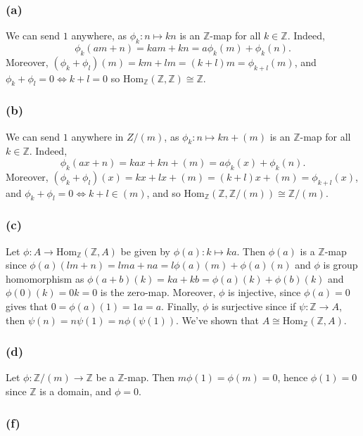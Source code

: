 \documentclass{article}
\theoremstyle{definition}
\newcommand{\Z}{\mathbb{Z}}
\newcommand{\Hom}{\text{Hom}}
\begin{document}
\subsubsection*{(a)}

We can send $1$ anywhere, as $\phi_k : n \mapsto k n$
is an $\Z$-map for all $k \in \Z$. Indeed, 
\[
	\phi_k(am + n)
	=
	kam + kn
	=
	a\phi_k(m) + \phi_k(n).
\] 
Moreover, $(\phi_k + \phi_{l})(m) = km + lm = (k + l)m = \phi_{k + l}(m)$, and
$\phi_k + \phi_l = 0 \Leftrightarrow k + l = 0$ so $\Hom_{\Z}(\Z, \Z) \cong \Z$.

\subsubsection*{(b)}

We can send $1$ anywhere in $Z/(m)$, as $\phi_k : n \mapsto k n + (m)$ is an
$\Z$-map for all $k \in \Z$. Indeed, 
\[
	\phi_k(ax + n)
	=
	kax + kn + (m)
	=
	a\phi_k(x) + \phi_k(n).
\] 
Moreover, $(\phi_k + \phi_{l})(x) = kx + lx + (m) = (k + l)x + (m) = \phi_{k +
l}(x)$, and $\phi_k + \phi_l = 0 \Leftrightarrow k + l \in (m)$, and so
$\Hom_{\Z}(\Z, \Z/(m)) \cong \Z/(m)$.

\subsubsection*{(c)}

Let $\phi : A \to \Hom_{\Z}(\Z, A)$ be given by $\phi(a) : k \mapsto ka$. Then
$\phi(a)$ is a $\Z$-map since $\phi(a)(lm + n) = lma + na = l\phi(a)(m) +
\phi(a)(n)$ and $\phi$ is group homomorphism as $\phi(a + b)(k) = ka + kb =
\phi(a)(k) + \phi(b)(k)$ and $\phi(0)(k) = 0k = 0$ is the zero-map. Moreover,
$\phi$ is injective, since $\phi(a) = 0$ gives that $0 = \phi(a)(1) = 1a = a$.
Finally, $\phi$ is surjective since if $\psi : \Z \to A$, then $\psi(n) = n
\psi(1) = n \phi(\psi(1))$. We've shown that $A \cong \Hom_{\Z}(\Z, A)$.

\subsubsection*{(d)}

Let $\phi : \Z/(m) \to \Z$ be a $\Z$-map. Then $m\phi(1) = \phi(m) = 0$, hence $\phi(1) = 0$
since $\Z$ is a domain, and $\phi = 0$.

\subsubsection*{(f)}
\end{document}

